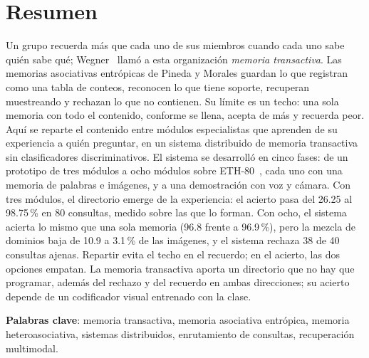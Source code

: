 \chapter*{Resumen}
\thispagestyle{empty}
Un grupo recuerda más que cada uno de sus miembros cuando cada uno sabe quién sabe qué;
Wegner~\cite{wegner1987transactive} llamó a esta organización \emph{memoria transactiva}.
Las memorias asociativas entrópicas de Pineda y Morales
\cite{pineda2022weighted,morales2025missing} guardan lo que registran como una tabla de
conteos, reconocen lo que tiene soporte, recuperan muestreando y rechazan lo que no
contienen.
Su límite es un techo: una sola memoria con todo el contenido, conforme se llena, acepta
de más y recuerda peor.
Aquí se reparte el contenido entre módulos especialistas que aprenden de su experiencia
a quién preguntar, en un sistema distribuido de memoria transactiva sin clasificadores
discriminativos.
El sistema se desarrolló en cinco fases: de un prototipo de tres módulos a ocho módulos
sobre ETH-80~\cite{leibe2003eth80}, cada uno con una memoria de palabras e imágenes, y a
una demostración con voz y cámara.
Con tres módulos, el directorio emerge de la experiencia: el acierto pasa del 26.25 al
98.75\,\% en 80 consultas, medido sobre las que lo forman.
Con ocho, el sistema acierta lo mismo que una sola memoria (96.8 frente a 96.9\,\%), pero
la mezcla de dominios baja de 10.9 a 3.1\,\% de las imágenes, y el sistema rechaza 38 de 40 consultas
ajenas.
Repartir evita el techo en el recuerdo; en el acierto, las dos opciones empatan.
La memoria transactiva aporta un directorio que no hay que programar, además del rechazo y del recuerdo en ambas direcciones; su acierto depende de un codificador visual entrenado con
la clase.


\noindent\textbf{Palabras clave}: memoria transactiva, memoria asociativa entrópica, memoria
heteroasociativa, sistemas distribuidos, enrutamiento de consultas, recuperación
multimodal.
